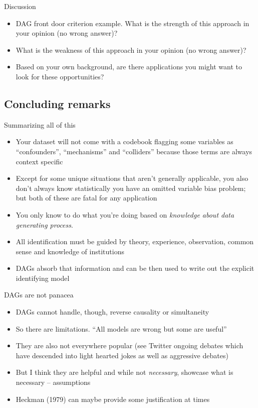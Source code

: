\documentclass{beamer}
\begin{document}
\begin{frame}{Discussion}

  \begin{itemize}
    \item DAG front door criterion example.  What is the strength of this approach in your opinion (no wrong answer)?
    \item What is the weakness of this approach in your opinion (no wrong answer)?
    \item Based on your own background, are there applications you might want to look for these opportunities?
  \end{itemize}

\end{frame}




\subsection{Concluding remarks}


\begin{frame}{Summarizing all of this}

  \begin{itemize}
    \item Your dataset will not come with a codebook flagging some variables as ``confounders'', ``mechanisms'' and ``colliders'' because those terms are always context specific
    \item Except for some unique situations that aren't generally applicable, you also don't always know statistically you have an omitted variable bias problem; but both of these are fatal for any application
    \item You only know to do what you're doing based on \emph{knowledge about data generating process}.
    \item All identification must be guided by theory, experience, observation, common sense and knowledge of institutions
    \item DAGs absorb that information and can be then used to write out the explicit identifying model
  \end{itemize}

\end{frame}

\begin{frame}{DAGs are not panacea}

  \begin{itemize}
    \item DAGs cannot handle, though, reverse causality or simultaneity
    \item So there are limitations.  ``All models are wrong but some are useful''
    \item They are also not everywhere popular (see Twitter ongoing debates which have descended into light hearted jokes as well as aggressive debates)
    \item But I think they are helpful and while not \emph{necessary}, showcase what is necessary -- assumptions
    \item Heckman (1979) can maybe provide some justification at times
  \end{itemize}

\end{frame}
\end{document}
